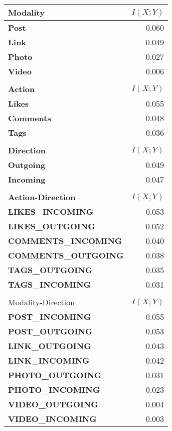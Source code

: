 
\cleardoublepage

\begin{table}

	\centering
	\begin{tabular}{| >{\small}l | >{\small}r|}
		\hline
		\textbf{Modality} & $I(X ; Y)$\\
		\hline
		\textbf{Post} & 0.060 \\
		\hline
		\textbf{Link} & 0.049\\
		\hline
		\textbf{Photo} & 0.027\\ 
		\hline
		\textbf{Video} & 0.006 \\	
		\hline
		
		\multicolumn{2}{c}{}\\
	
		\hline
		\textbf{Action}  & $I(X ; Y)$ \\
		\hline
		\textbf{Likes}  &  0.055 \\
		\hline
		\textbf{Comments}  &  0.048 \\
		\hline
		\textbf{Tags}  &  0.036 \\
		\hline

		\multicolumn{2}{c}{}\\
		
		\hline
		\textbf{Direction} & $I(X ; Y)$ \\
		\hline
		\textbf{Outgoing}  &  0.049 \\
		\hline
		\textbf{Incoming}  &  0.047 \\
		\hline

		\multicolumn{2}{c}{}\\


		\hline
		\textbf{Action-Direction}& $I(X ; Y)$ \\		
		\hline
		\textbf{LIKES\_INCOMING} & 0.053 \\
		\textbf{LIKES\_OUTGOING} & 0.052 \\
		\textbf{COMMENTS\_INCOMING} & 0.040 \\
		\textbf{COMMENTS\_OUTGOING} & 0.038 \\
		\textbf{TAGS\_OUTGOING} & 0.035 \\
		\textbf{TAGS\_INCOMING} & 0.031 \\
		\hline

		\multicolumn{2}{c}{}\\

		\hline
		Modality-Direction & $I(X ; Y)$ \\
		\hline
		\textbf{POST\_INCOMING} & 0.055 \\
		\textbf{POST\_OUTGOING} & 0.053 \\
		\textbf{LINK\_OUTGOING} & 0.043 \\
		\textbf{LINK\_INCOMING} & 0.042 \\
		\textbf{PHOTO\_OUTGOING} & 0.031 \\
		\textbf{PHOTO\_INCOMING} & 0.023 \\
		\textbf{VIDEO\_OUTGOING} & 0.004 \\
		\textbf{VIDEO\_INCOMING} & 0.003 \\
		\hline
				
	\end{tabular}
\end{table}


